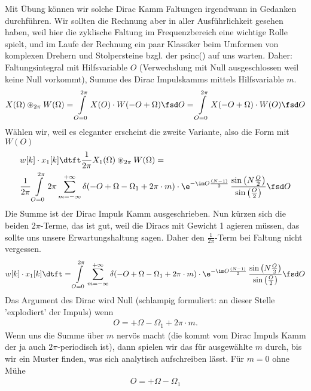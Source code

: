 \begin{ExCalc}
Mit Übung können wir solche Dirac Kamm Faltungen irgendwann in Gedanken durchführen.
Wir sollten die Rechnung aber in aller Ausführlichkeit gesehen haben, weil hier
die zyklische Faltung im Frequenzbereich eine wichtige Rolle spielt,
und im Laufe der Rechnung ein paar Klassiker beim Umformen von komplexen Drehern
und Stolpersteine bzgl. der psinc() auf uns warten. Daher:
%
Faltungsintegral mit Hilfsvariable $O$ (Verwechslung mit Null ausgeschlossen weil
keine Null vorkommt), Summe des Dirac Impulskamms mittels
Hilfsvariable $m$.
\begin{align}
X(\Omega) \circledast_{2\pi} W(\Omega) =
\int\limits_{O=0}^{2\pi} X(O) \cdot W(-O + \Omega) \fsd O =
\int\limits_{O=0}^{2\pi} X(-O+\Omega) \cdot W(O) \fsd O
\end{align}
%
Wählen wir, weil es eleganter erscheint die zweite Variante, also die Form mit $W(O)$
\begin{align}
&w[k] \cdot x_1[k]\dtft
\frac{1}{2\pi}
X_1(\Omega) \circledast_{2\pi} W(\Omega)
=\\
&\frac{1}{2\pi}
\int\limits_{O=0}^{2\pi}
2\pi \sum\limits_{m=-\infty}^{+\infty}
\delta(-O+\Omega-\Omega_1 + 2\pi\cdot m)
\cdot
\e^{-\im O \frac{(N-1)}{2}}\,
\frac{\sin\left(N\frac{O}{2}\right)}{\sin\left(\frac{O}{2}\right)}\fsd O
\end{align}
Die Summe ist der Dirac Impuls Kamm ausgeschrieben. Nun kürzen sich die beiden
$2\pi$-Terme, das ist gut, weil die Diracs mit Gewicht 1 agieren müssen, das
sollte uns unsere Erwartungshaltung sagen.
Daher den $\frac{1}{2\pi}$-Term bei Faltung nicht vergessen.
%
\begin{align}
w[k] \cdot x_1[k]\dtft=
\int\limits_{O=0}^{2\pi}
\sum\limits_{m=-\infty}^{+\infty}
\delta(-O+\Omega-\Omega_1 + 2\pi\cdot m)
\cdot
\e^{-\im O \frac{(N-1)}{2}}\,
\frac{\sin\left(N\frac{O}{2}\right)}{\sin\left(\frac{O}{2}\right)}\fsd O
\end{align}
Das Argument des Dirac wird Null (schlampig formuliert:
an dieser Stelle 'explodiert' der Impuls) wenn
\begin{align}
O=+\Omega-\Omega_1 + 2\pi\cdot m.
\end{align}
Wenn uns die Summe über $m$ nervös macht (die kommt vom Dirac Impuls Kamm
der ja auch $2\pi$-periodisch ist), dann spielen wir das für ausgewählte
$m$ durch, bis wir ein Muster finden, was sich analytisch aufschreiben lässt.
%
Für $m=0$ ohne Mühe
\begin{align}
O=+\Omega-\Omega_1
\end{align}

\end{ExCalc}
